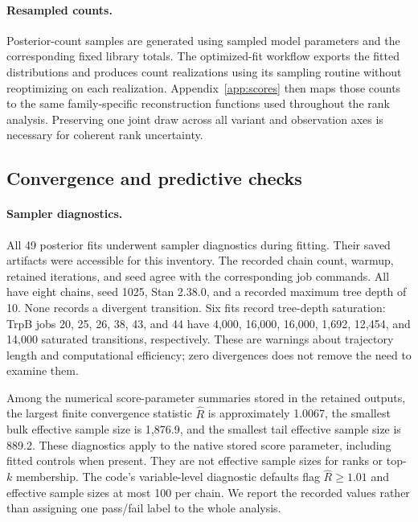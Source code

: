 \paragraph{Resampled counts.}
Posterior-count samples are generated using sampled model parameters and
the corresponding fixed library totals. The optimized-fit workflow exports
the fitted distributions and produces count realizations using its sampling
routine without reoptimizing on each realization. Appendix~\ref{app:scores}
then maps those counts to the same family-specific reconstruction functions
used throughout the rank analysis. Preserving one joint draw across all
variant and observation axes is necessary for coherent rank uncertainty.

\subsection{Convergence and predictive checks}
\label{app:fit-checks}

\paragraph{Sampler diagnostics.}
All 49 posterior fits underwent sampler diagnostics during fitting.
Their saved artifacts were accessible for this inventory. The recorded
chain count, warmup, retained iterations, and seed agree with the corresponding
job commands. All have eight chains, seed 1025, Stan 2.38.0, and a recorded
maximum tree depth of 10. None records a divergent transition. Six fits record
tree-depth saturation: TrpB jobs 20, 25, 26, 38, 43, and 44 have 4,000,
16,000, 16,000, 1,692, 12,454, and 14,000 saturated transitions, respectively.
These are warnings about trajectory length and computational efficiency;
zero divergences does not remove the need to examine them.

Among the numerical score-parameter summaries stored in the retained
outputs, the largest finite convergence statistic $\hat R$ is approximately 1.0067,
the smallest bulk effective sample size is 1,876.9,
and the smallest tail effective sample size is 889.2. These diagnostics apply
to the native stored score parameter, including fitted controls when present.
They are not effective sample sizes for ranks or top-$k$ membership.
The code's variable-level diagnostic
defaults flag $\hat R\geq1.01$ and effective sample sizes at most 100 per
chain. We report the recorded values rather than assigning one pass/fail
label to the whole analysis.

